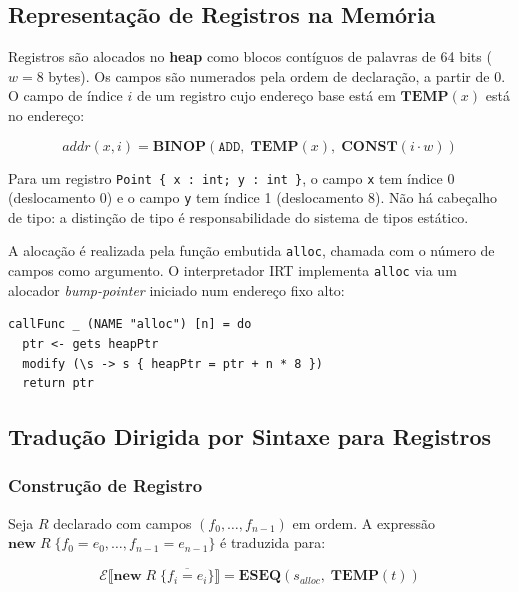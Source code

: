 \subsection{Representação de Registros na Memória}
\label{sec:ir-record-layout}

Registros são alocados no \textbf{heap} como blocos contíguos de palavras
de 64 bits (\(w = 8\) bytes). Os campos são numerados pela ordem de
declaração, a partir de 0. O campo de índice \(i\) de um registro cujo
endereço base está em \(\mathbf{TEMP}(x)\) está no endereço:

\[
  \mathit{addr}(x, i) = \mathbf{BINOP}(\mathtt{ADD},\; \mathbf{TEMP}(x),\;
  \mathbf{CONST}(i \cdot w))
\]

Para um registro \texttt{Point \{ x : int; y : int \}}, o campo \texttt{x}
tem índice 0 (deslocamento 0) e o campo \texttt{y} tem índice 1
(deslocamento 8). Não há cabeçalho de tipo: a distinção de tipo é
responsabilidade do sistema de tipos estático.

A alocação é realizada pela função embutida \texttt{alloc}, chamada com
o número de campos como argumento. O interpretador IRT implementa
\texttt{alloc} via um alocador \emph{bump-pointer} iniciado num endereço
fixo alto:

\begin{verbatim}
callFunc _ (NAME "alloc") [n] = do
  ptr <- gets heapPtr
  modify (\s -> s { heapPtr = ptr + n * 8 })
  return ptr
\end{verbatim}

\subsection{Tradução Dirigida por Sintaxe para Registros}
\label{sec:ir-record-sdt}

\subsubsection*{Construção de Registro}

Seja \(R\) declarado com campos \((f_0,\ldots,f_{n-1})\) em ordem. A
expressão \(\mathbf{new}\; R\;\{f_0\!=\!e_0,\ldots,f_{n-1}\!=\!e_{n-1}\}\)
é traduzida para:

\[
  \mathcal{E}\llbracket \mathbf{new}\; R\;\{\overline{f_i\!=\!e_i}\} \rrbracket
  = \mathbf{ESEQ}(s_{\mathit{alloc}},\; \mathbf{TEMP}(t))
\]

